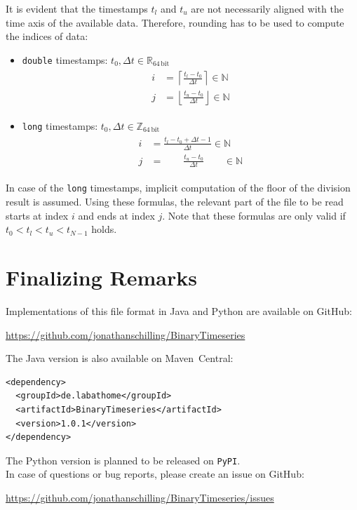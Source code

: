 \documentclass[a4paper,10pt]{article}
\begin{document}
It is evident that the timestamps $t_l$ and $t_u$ are not necessarily aligned with the time axis of the available data.
Therefore, rounding has to be used to compute the indices of data:
\begin{itemize}
  \item \texttt{double} timestamps: $t_0, \Delta t \in \mathbb{R}_\mathrm{64\,bit}$
  \begin{gather}
   \begin{align}
    i & = \left\lceil  \frac{t_l - t_0}{\Delta t} \right\rceil  \in \mathbb{N} \\
    j & = \left\lfloor \frac{t_u - t_0}{\Delta t} \right\rfloor \in \mathbb{N}
   \end{align}
  \end{gather}
  \item \texttt{long} timestamps: $t_0, \Delta t \in \mathbb{Z}_\mathrm{64\,bit}$
  \begin{gather}
   \begin{align}
    i & = \frac{t_l - t_0 + \Delta t - 1}{\Delta t} \in \mathbb{N} \\
    j & = \qquad \frac{t_u - t_0}{\Delta t} \qquad  \in \mathbb{N}
   \end{align}
  \end{gather}
\end{itemize}
In case of the \texttt{long} timestamps, implicit computation of the floor of the division result is assumed.
Using these formulas, the relevant part of the file to be read starts at index $i$ and ends at index $j$.
Note that these formulas are only valid if $t_0 < t_l < t_u < t_{N-1}$ holds.








\section{Finalizing Remarks}
Implementations of this file format in Java and Python are available on GitHub:
\begin{center}
\href{https://github.com/jonathanschilling/BinaryTimeseries}{https://github.com/jonathanschilling/BinaryTimeseries}
\end{center}
The Java version is also available on Maven~Central:
\begin{verbatim}
<dependency>
  <groupId>de.labathome</groupId>
  <artifactId>BinaryTimeseries</artifactId>
  <version>1.0.1</version>
</dependency>
\end{verbatim}
The Python version is planned to be released on \texttt{PyPI}.\\
In case of questions or bug reports, please create an issue on GitHub:
\begin{center}
\href{https://github.com/jonathanschilling/BinaryTimeseries/issues}{https://github.com/jonathanschilling/BinaryTimeseries/issues}
\end{center}
\end{document}
